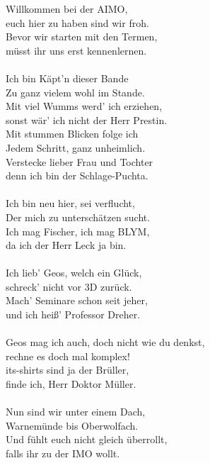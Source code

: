 \documentclass[oneside]{memoir}
\begin{document}
\begin{singlespace}
Willkommen bei der AIMO, \\
euch hier zu haben sind wir froh. \\
Bevor wir starten mit den Termen, \\
müsst ihr uns erst kennenlernen. \\  \\

Ich bin Käpt'n dieser Bande \\
Zu ganz vielem wohl im Stande. \\
Mit viel Wumms werd' ich erziehen, \\
sonst wär' ich nicht der Herr Prestin. \\

Mit stummen Blicken folge ich \\
Jedem Schritt, ganz unheimlich. \\
Verstecke lieber Frau und Tochter \\
denn ich bin der Schlage-Puchta. \\ \\

Ich bin neu hier, sei verflucht, \\
Der mich zu unterschätzen sucht. \\
Ich mag Fischer, ich mag BLYM, \\
 da ich der Herr Leck ja bin. \\ \\

Ich lieb' Geos, welch ein Glück, \\
schreck' nicht vor 3D zurück. \\
Mach' Seminare schon seit jeher, \\
und ich heiß' Professor Dreher. \\ \\

Geos mag ich auch, doch nicht wie du denkst, \\
rechne es doch mal komplex! \\
its-shirts sind ja der Brüller, \\
finde ich, Herr Doktor Müller. \\ \\

Nun sind wir unter einem Dach, \\
Warnemünde bis Oberwolfach. \\
Und fühlt euch nicht gleich überrollt, \\
falls ihr zu der IMO wollt.
\end{singlespace}
\onehalfspacing
\end{document}
